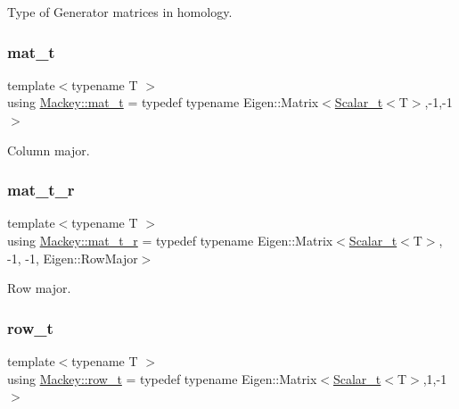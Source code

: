 Type of Generator matrices in homology. 

\mbox{\label{namespaceMackey_a035386035757dade630f685e508e5cf9}} 
\subsubsection{\texorpdfstring{mat\+\_\+t}{mat\_t}}
{\footnotesize\ttfamily template$<$typename T $>$ \\
using \hyperlink{namespaceMackey_a035386035757dade630f685e508e5cf9}{Mackey\+::mat\+\_\+t} = typedef typename Eigen\+::\+Matrix$<$\hyperlink{namespaceMackey_a93ba297573961f91101fb84bc84bbe95}{Scalar\+\_\+t}$<$T$>$,-\/1,-\/1$>$}



Column major. 

\mbox{\label{namespaceMackey_ac1c9f85957dda772ceaa564cb23494cb}} 
\subsubsection{\texorpdfstring{mat\+\_\+t\+\_\+r}{mat\_t\_r}}
{\footnotesize\ttfamily template$<$typename T $>$ \\
using \hyperlink{namespaceMackey_ac1c9f85957dda772ceaa564cb23494cb}{Mackey\+::mat\+\_\+t\+\_\+r} = typedef typename Eigen\+::\+Matrix$<$\hyperlink{namespaceMackey_a93ba297573961f91101fb84bc84bbe95}{Scalar\+\_\+t}$<$T$>$, -\/1, -\/1, Eigen\+::\+Row\+Major$>$}



Row major. 

\mbox{\label{namespaceMackey_a6d37801553e585770ca7d1243ab3b213}} 
\subsubsection{\texorpdfstring{row\+\_\+t}{row\_t}}
{\footnotesize\ttfamily template$<$typename T $>$ \\
using \hyperlink{namespaceMackey_a6d37801553e585770ca7d1243ab3b213}{Mackey\+::row\+\_\+t} = typedef typename Eigen\+::\+Matrix$<$\hyperlink{namespaceMackey_a93ba297573961f91101fb84bc84bbe95}{Scalar\+\_\+t}$<$T$>$,1,-\/1$>$}



